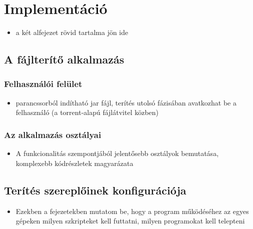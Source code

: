 \chapter{Implementáció}
\label{chp:implementation}
\begin{itemize}
  \item a két alfejezet rövid tartalma jön ide
\end{itemize}

\section{A fájlterítő alkalmazás}

%
\subsection{Felhasználói felület}
%
\begin{itemize}
  \item parancssorból indítható jar fájl, terítés utolsó fázisában avatkozhat be a felhasználó (a torrent-alapú fájlátvitel közben)
\end{itemize}

%
\subsection{Az alkalmazás osztályai}
%

\begin{itemize}
  \item A funkcionalitás szempontjából jelentősebb osztályok bemutatása, komplexebb kódrészletek magyarázata
\end{itemize}

\section{Terítés szereplőinek konfigurációja}

\begin{itemize}
  \item Ezekben a fejezetekben mutatom be, hogy a program működéséhez az egyes gépeken milyen szkripteket kell futtatni, milyen programokat kell telepteni
\end{itemize}


